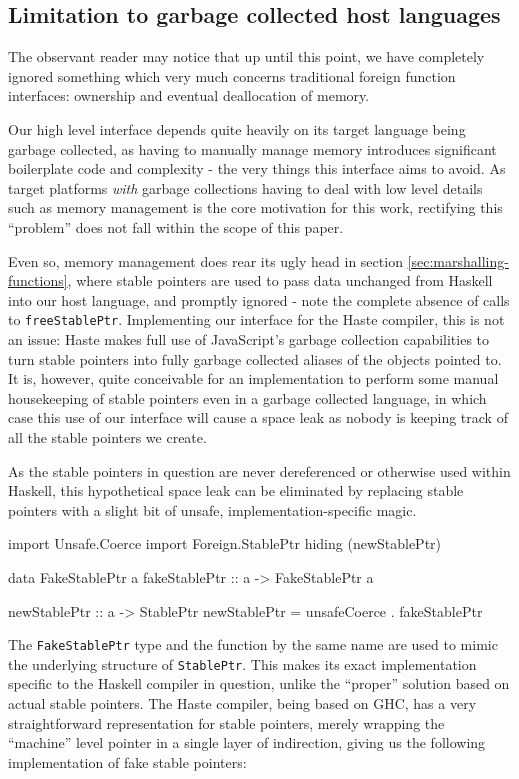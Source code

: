 \documentclass{sigplanconf}
\begin{document}
\subsection{Limitation to garbage collected host languages}
\label{sec:host-gc}
The observant reader may notice that up until this point, we have completely
ignored something which very much concerns traditional foreign function
interfaces: ownership and eventual deallocation of memory.

Our high level interface depends quite heavily on its target language being
garbage collected, as having to manually manage memory introduces significant
boilerplate code and complexity - the very things this interface aims to avoid.
As target platforms \emph{with} garbage collections having to deal with low
level details such as memory management is the core motivation for this work,
rectifying this ``problem'' does not fall within the scope of this paper.

Even so, memory management does rear its ugly head in section
\ref{sec:marshalling-functions}, where stable pointers are used to pass data
unchanged from Haskell into our host language, and promptly ignored - note
the complete absence of calls to \lstinline!freeStablePtr!. Implementing our
interface for the Haste compiler, this is not an issue: Haste makes full use
of JavaScript's garbage collection capabilities to turn stable pointers into
fully garbage collected aliases of the objects pointed to.
It is, however, quite conceivable for an implementation to perform some manual
housekeeping of stable pointers even in a garbage collected language, in which
case this use of our interface will cause a space leak as nobody is keeping
track of all the stable pointers we create.

As the stable pointers in question are never dereferenced or otherwise
used within Haskell, this hypothetical space leak can be eliminated by
replacing stable pointers with a slight bit of unsafe, implementation-specific
magic.

\begin{code}
  import Unsafe.Coerce
  import Foreign.StablePtr hiding (newStablePtr)

  data FakeStablePtr a
  fakeStablePtr :: a -> FakeStablePtr a

  newStablePtr :: a -> StablePtr
  newStablePtr = unsafeCoerce . fakeStablePtr
\end{code}

The \lstinline!FakeStablePtr! type and the function by the same name are used
to mimic the underlying structure of \lstinline!StablePtr!. This makes its
exact implementation specific to the Haskell compiler in question, unlike
the ``proper'' solution based on actual stable pointers. The Haste
compiler, being based on GHC, has a very straightforward representation for
stable pointers, merely wrapping the ``machine'' level pointer in a single
layer of indirection, giving us the following implementation of fake stable
pointers:
\end{document}
